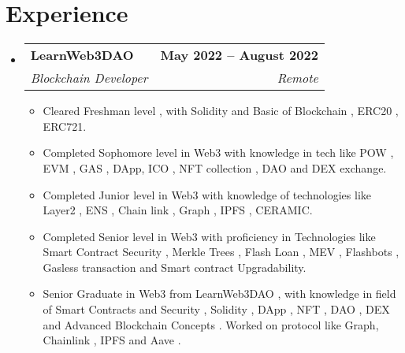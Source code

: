 \documentclass[letterpaper,11pt]{article}
\makeatletter
\newcommand{\resumeItem}[1]{
  \item\small{
    {#1 \vspace{-2pt}}
  }
}
\newcommand{\resumeSubheading}[4]{
  \vspace{-2pt}\item
    \begin{tabular*}{1.0\textwidth}[t]{l@{\extracolsep{\fill}}r}
      \textbf{#1} & \textbf{\small #2} \\
      \textit{\small#3} & \textit{\small #4} \\
    \end{tabular*}\vspace{-7pt}
}
\newcommand{\resumeSubHeadingListStart}{\begin{itemize}[leftmargin=0.0in, label={}]}
\newcommand{\resumeSubHeadingListEnd}{\end{itemize}}
\newcommand{\resumeItemListStart}{\begin{itemize}}
\newcommand{\resumeItemListEnd}{\end{itemize}\vspace{-5pt}}
\makeatother
\begin{document}
\section{Experience}
  \resumeSubHeadingListStart

    \resumeSubheading
      {LearnWeb3DAO}{May 2022 -- August 2022}
      {Blockchain Developer}{Remote}
      \resumeItemListStart
        \resumeItem{Cleared Freshman level , with Solidity and Basic of Blockchain , ERC20 , ERC721.}
        \resumeItem{Completed Sophomore level in Web3 with knowledge in tech like POW , EVM , GAS , DApp, ICO , NFT collection , DAO and DEX exchange.}
        \resumeItem{Completed Junior level in Web3 with knowledge of technologies like Layer2 , ENS , Chain link , Graph , IPFS , CERAMIC.}
        \resumeItem{Completed Senior level in Web3 with proficiency in Technologies like Smart Contract Security , Merkle Trees , Flash Loan , MEV , Flashbots , Gasless transaction and Smart contract Upgradability.}
        \resumeItem{ Senior Graduate in Web3 from LearnWeb3DAO , with knowledge in field of Smart Contracts and Security , Solidity , DApp , NFT , DAO , DEX and Advanced Blockchain Concepts . Worked on protocol like Graph, Chainlink , IPFS and Aave .}
      \resumeItemListEnd
    
  \resumeSubHeadingListEnd
\vspace{-16pt}

\end{document}
